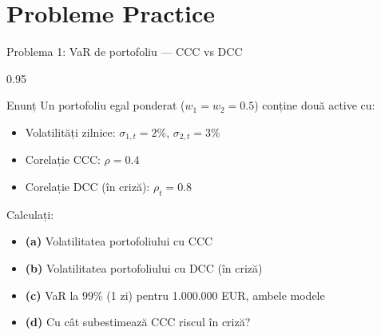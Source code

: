 \documentclass[9pt, aspectratio=169, t]{beamer}
\begin{document}
\section{Probleme Practice}

\begin{frame}{Problema 1: VaR de portofoliu --- CCC vs DCC}
    \begin{cminipage}{0.95\textwidth}
    \begin{block}{Enunț}
        Un portofoliu egal ponderat ($w_1 = w_2 = 0.5$) conține două active cu:
        \begin{itemize}\setlength{\itemsep}{0pt}
            \item Volatilități zilnice: $\sigma_{1,t} = 2\%$, $\sigma_{2,t} = 3\%$
            \item Corelație CCC: $\rho = 0.4$
            \item Corelație DCC (în criză): $\rho_t = 0.8$
        \end{itemize}

        \vspace{0.3cm}
        Calculați:
        \begin{itemize}\setlength{\itemsep}{0pt}
            \item \textbf{(a)} Volatilitatea portofoliului cu CCC
            \item \textbf{(b)} Volatilitatea portofoliului cu DCC (în criză)
            \item \textbf{(c)} VaR la 99\% (1 zi) pentru 1.000.000 EUR, ambele modele
            \item \textbf{(d)} Cu cât subestimează CCC riscul în criză?
        \end{itemize}
    \end{block}
    \end{cminipage}
\end{frame}
\end{document}
